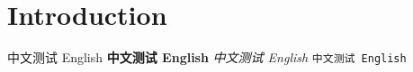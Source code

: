 \documentclass{ctexart}
\begin{document}
\section{Introduction}
中文测试 English
\textbf{中文测试 English}
\emph{中文测试 English}
\texttt{中文测试 English}
\end{document}
